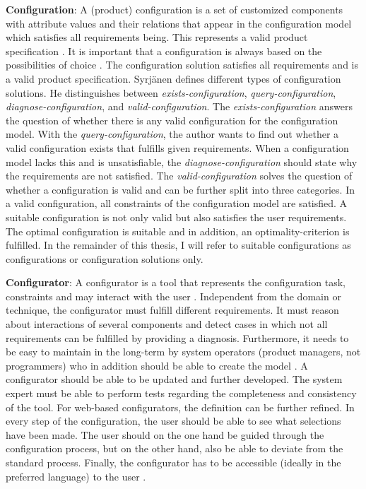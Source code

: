 \textbf{Configuration}: A (product) configuration is a set of customized components with attribute values and their relations that appear in the configuration model which satisfies all requirements being. This represents a valid product specification \cite{sotimasu98a, junker06a, fefaateruraz17a, sonitisu01a}. It is important that a configuration is always based on the possibilities of choice \cite{soinie99a}. The configuration solution satisfies all requirements and is a valid product specification. Syrjänen \cite{syrjanen99a} defines different types of configuration solutions. He distinguishes between \textit{exists-configuration}, \textit{query-configuration}, \textit{diagnose-configuration}, and \textit{valid-configuration}. The \textit{exists-configuration} answers the question of whether there is any valid configuration for the configuration model. With the \textit{query-configuration}, the author wants to find out whether a valid configuration exists that fulfills given requirements. When a configuration model lacks this and is unsatisfiable, the \textit{diagnose-configuration} should state why the requirements are not satisfied. The \textit{valid-configuration} solves the question of whether a configuration is valid and can be further split into three categories. In a valid configuration, all constraints of the configuration model are satisfied. A suitable configuration is not only valid but also satisfies the user requirements. The optimal configuration is suitable and in addition, an optimality-criterion is fulfilled. In the remainder of this thesis, I will refer to suitable configurations as configurations or configuration solutions only.   \newline 

\textbf{Configurator}: A configurator is a tool that represents the configuration task, constraints and may interact with the user \cite{jabogrma10a}. Independent from the domain or technique, the configurator must fulfill different requirements. It must reason about interactions of several components and detect cases in which not all requirements can be fulfilled by providing a diagnosis. Furthermore, it needs to be easy to maintain in the long-term by system operators (product managers, not programmers) who in addition should be able to create the model \cite{junker06a, tisonisu03a}. A configurator should be able to be updated and further developed. The system expert must be able to perform tests regarding the completeness and consistency of the tool. For web-based configurators, the definition can be further refined. In every step of the configuration, the user should be able to see what selections have been made. The user should on the one hand be guided through the configuration process, but on the other hand, also be able to deviate from the standard process. Finally, the configurator has to be accessible (ideally in the preferred language) to the user \cite{tisonisu03a}. 


